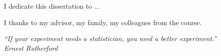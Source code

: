 \begin{dedicatoria}
    \vspace*{\fill}
    \hfill
    \begin{minipage}{.6\textwidth}
     I dedicate this dissertation to ...
    \end{minipage}
\end{dedicatoria}
 
\begin{agradecimentos}
    I thanks to my advisor, my family, my colleagues from the course.  

\end{agradecimentos}

\begin{epigrafe}
\vspace*{\fill}
\begin{flushright}
    \textit{
        ``If your experiment needs a statistician, you need a better
        experiment.''} \\
        \textit{Ernest Rutherford}
\end{flushright}
\end{epigrafe}